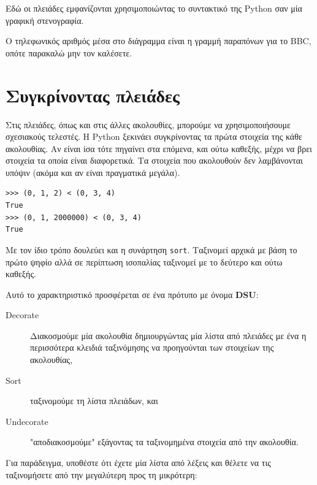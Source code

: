 \documentclass[10pt]{book}
\begin{document}
Εδώ οι πλειάδες εμφανίζονται χρησιμοποιώντας το συντακτικό της Python σαν μία γραφική στενογραφία.

Ο τηλεφωνικός αριθμός μέσα στο διάγραμμα είναι η γραμμή παραπόνων για το BBC, οπότε παρακαλώ μην τον καλέσετε.


\section{Συγκρίνοντας πλειάδες}

Στις πλειάδες, όπως και στις άλλες ακολουθίες, μπορούμε να χρησιμοποιήσουμε σχεσιακούς τελεστές. Η Python ξεκινάει συγκρίνοντας τα πρώτα στοιχεία  της κάθε ακολουθίας. Αν είναι ίσα τότε πηγαίνει στα επόμενα, και ούτω καθεξής, μέχρι να βρει στοιχεία τα οποία είναι διαφορετικά. Τα στοιχεία που ακολουθούν δεν λαμβάνονται υπόψιν (ακόμα και αν είναι πραγματικά μεγάλα).

 
\begin{verbatim}
>>> (0, 1, 2) < (0, 3, 4)
True
>>> (0, 1, 2000000) < (0, 3, 4)
True
\end{verbatim}
%
Με τον ίδιο τρόπο δουλεύει και η συνάρτηση {\tt sort}. Ταξινομεί αρχικά με βάση το πρώτο ψηφίο αλλά σε περίπτωση ισοπαλίας ταξινομεί με το δεύτερο και ούτω καθεξής.

Αυτό το χαρακτηριστικό προσφέρεται σε ένα πρότυπο με όνομα {\bf DSU}:

\begin{description}

\item[Decorate] Διακοσμούμε μία ακολουθία δημιουργώντας μία λίστα από πλειάδες με ένα η περισσότερα κλειδιά ταξινόμησης να προηγούνται των στοιχείων της ακολουθίας, 

\item[Sort] ταξινομούμε τη λίστα πλειάδων, και 

\item[Undecorate] "αποδιακοσμούμε" εξάγοντας τα ταξινομημένα στοιχεία από την ακολουθία. 

\end{description}

\label{DSU}

Για παράδειγμα, υποθέστε ότι έχετε μία λίστα από λέξεις και θέλετε να τις ταξινομήσετε από την μεγαλύτερη προς τη μικρότερη:
\end{document}
